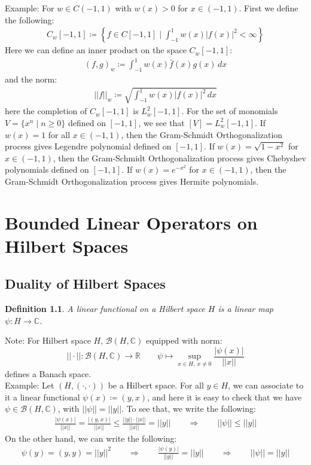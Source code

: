 \documentclass[11pt]{book}
\theoremstyle{break}
\theoremstyle{break}
\newtheorem{defn}{Definition}[corL]
\newcommand{\R}{\mathbb{R}}
\newcommand{\C}{\mathbb{C}}
\newcommand{\note}{\color{red}Note: \color{black}}
\newcommand{\example}{\color{green}Example: \color{black}}
\begin{document}
\example
For $w \in C(-1,1)$ with $w(x) >0$ for $x \in (-1,1)$. First we define the following:
\begin{align*}
C_{w}[-1,1] \coloneqq \left\{ f \in C[-1,1]\mid \int_{-1}^1 w(x) |f(x)|^2 < \infty \right\}
\end{align*}
Here we can define an inner product on the space $C_w[-1,1]$:
\begin{align*}
(f,g)_w \coloneqq \int_{-1}^1 w(x) \bar{f}(x) g(x) \, dx
\end{align*}
and the norm:
\begin{align*}
||f||_w \coloneqq \sqrt{\int_{-1}^1 w(x) |f(x)|^2 \, dx}
\end{align*}
here the completion of $C_w[-1,1]$ is $L_w^2[-1,1]$. For the set of monomials $V = \{x^n \mid n\geq 0\}$ defined on $[-1,1]$, we see that $[V] = L_w^2[-1,1]$. If $w(x) = 1$ for all $x \in (-1,1)$, then the Gram-Schmidt Orthogonalization process gives Legendre polynomial defined on $[-1,1]$. If $w(x) = \sqrt{1-x^2}$ for $x \in (-1,1)$, then the Gram-Schmidt Orthogonalization process gives Chebyshev polynomials defined on $[-1,1]$. If $w(x) = e^{-x^2}$ for $x \in (-1,1)$, then the Gram-Schmidt Orthogonalization process gives Hermite polynomials. 


\newpage
\chapter{Bounded Linear Operators on Hilbert Spaces}
\setcounter{section}{25}
\section[Duality of Hilbert Space]{\color{red} Duality of Hilbert Spaces\color{black}}
\begin{defn}
A linear functional on a Hilbert space $H$ is a linear map $\psi:H \to \C$. 
\end{defn}

\note For Hilbert space $H$, $\mathcal{B}(H,\C)$ equipped with norm:
$$||\cdot ||:\mathcal{B}(H,\C) \to \R \qquad \psi\mapsto \sup_{x \in H,\ x\neq 0}\frac{|\psi(x)|}{||x||} $$
defines a Banach space.\\

\example Let $(H,(\cdot,\cdot))$ be a Hilbert space. For all $y \in H$, we can associate to it a linear functional $\psi(x) \coloneqq (y,x)$, and here it is easy to check that we have $\psi \in \mathcal{B}(H,\C)$, with $||\psi|| = ||y||$. To see that, we write the following:
\begin{align*}
\frac{|\psi(x)|}{||x||} = \frac{|(y,x)|}{||x||} \leq \frac{||y|| \cdot ||x||}{||x||} = ||y|| \qquad \Rightarrow \qquad ||\psi||\leq ||y||
\end{align*}
On the other hand, we can write the following:
\begin{align*}
\psi(y) = (y,y) = ||y||^2 \qquad \Rightarrow \qquad \frac{|\psi(y)|}{||y||} = ||y|| \qquad \Rightarrow \qquad ||\psi|| = ||y||
\end{align*}
\end{document}
